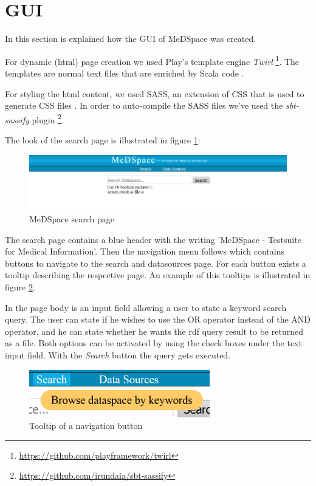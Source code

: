 \section{GUI}
In this section is explained how the GUI of MeDSpace was created.

For dynamic (html) page creation we used Play's template engine \emph{Twirl} \footnote{\url{https://github.com/playframework/twirl}}. The templates are normal text files that are enriched by Scala code \cite{PlayJavaTemplates}.

For styling the html content, we used SASS, an extension of CSS that is used to generate CSS files \cite{SASS}. In order to auto-compile the SASS files we've used the \emph{sbt-sassify} plugin \footnote{\url{https://github.com/irundaia/sbt-sassify}}. 

The look of the search page is illustrated in figure \ref{MeDSpaceSearchPage}:

\begin{figure}[H]
	\begin{center}
		\includegraphics[width=1\textwidth]{figures/MeDSpace-GUI-Search-Main.png}
	\end{center}
	\caption{MeDSpace search page}
	\label{MeDSpaceSearchPage}
\end{figure}

The search page contains a blue header with the writing 'MeDSpace - Testsuite for Medical Information'. Then the navigation menu follows which contains buttons to navigate to the search and datasources page. For each button exists a tooltip describing the respective page. An example of this tooltips is illustrated in figure \ref{MeDSpaceDataTooltip}. 

In the page body is an input field allowing a user to state a keyword search query. The user can state if he wishes to use the OR operator instead of the AND operator, and he can state whether he wants the rdf query result to be returned as a file. Both options can be activated by using the check boxes under the text input field. With the \emph{Search} button the query gets executed.

\begin{figure}[H]
	\begin{center}
		\includegraphics[width=0.7\textwidth]{figures/MeDSpace-GUI-Tooltip.png}
	\end{center}
	\caption{Tooltip of a navigation button}
	\label{MeDSpaceDataTooltip}
\end{figure}


